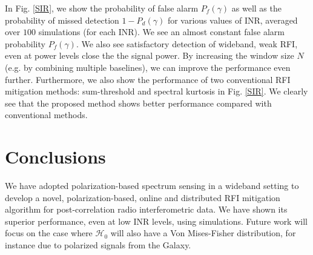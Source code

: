 \documentclass[conference]{IEEEtran}
\begin{document}
In Fig. \ref{SIR}, we show the probability of false alarm $P_f(\gamma)$ as well as the probability of missed detection $1-P_d(\gamma)$  for various values of INR, averaged over $100$ simulations (for each INR). We see an almost constant false alarm probability $P_f(\gamma)$. We also see satisfactory detection of wideband, weak RFI, even at power levels close the the signal power. By increasing the window size $N$ (e.g. by combining multiple baselines), we can improve the performance even further. Furthermore, we also show the performance of two conventional RFI mitigation methods: sum-threshold \cite{aoflagger} and spectral kurtosis \cite{SK2010} in Fig. \ref{SIR}. We clearly see that the proposed method shows better performance compared with conventional methods.
\section{Conclusions}\label{sec:conclusions}
We have adopted polarization-based spectrum sensing \cite{Guo2013} in a wideband setting \cite{Quan} to develop a novel, polarization-based, online and distributed RFI mitigation algorithm for post-correlation radio interferometric data. We have shown its superior performance, even at low INR levels, using simulations. Future work will focus on the case where $\mathcal{H}_0$ will also have a Von Mises-Fisher distribution, for instance due to polarized signals from the Galaxy. 


\end{document}
